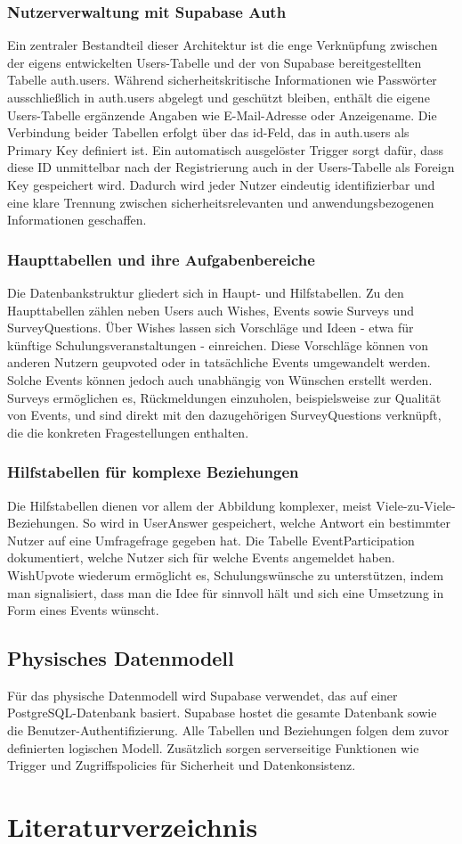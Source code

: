 \documentclass[a4paper,12pt]{article}
\begin{document}
\subsubsection{Nutzerverwaltung mit Supabase Auth}
Ein zentraler Bestandteil dieser Architektur ist die enge Verknüpfung zwischen der eigens entwickelten Users-Tabelle und der von Supabase bereitgestellten Tabelle auth.users. Während sicherheitskritische Informationen wie Passwörter ausschließlich in auth.users abgelegt und geschützt bleiben, enthält die eigene Users-Tabelle ergänzende Angaben wie E-Mail-Adresse oder Anzeigename. Die Verbindung beider Tabellen erfolgt über das id-Feld, das in auth.users als Primary Key definiert ist. Ein automatisch ausgelöster Trigger sorgt dafür, dass diese ID unmittelbar nach der Registrierung auch in der Users-Tabelle als Foreign Key gespeichert wird. Dadurch wird jeder Nutzer eindeutig identifizierbar und eine klare Trennung zwischen sicherheitsrelevanten und anwendungsbezogenen Informationen geschaffen.
\subsubsection{Haupttabellen und ihre Aufgabenbereiche}
Die Datenbankstruktur gliedert sich in Haupt- und Hilfstabellen. Zu den Haupttabellen zählen neben Users auch Wishes, Events sowie Surveys und SurveyQuestions. Über Wishes lassen sich Vorschläge und Ideen - etwa für künftige Schulungsveranstaltungen - einreichen. Diese Vorschläge können von anderen Nutzern geupvoted oder in tatsächliche Events umgewandelt werden. Solche Events können jedoch auch unabhängig von Wünschen erstellt werden. Surveys ermöglichen es, Rückmeldungen einzuholen, beispielsweise zur Qualität von Events, und sind direkt mit den dazugehörigen SurveyQuestions verknüpft, die die konkreten Fragestellungen enthalten.
\subsubsection{Hilfstabellen für komplexe Beziehungen}
Die Hilfstabellen dienen vor allem der Abbildung komplexer, meist Viele-zu-Viele-Beziehungen. So wird in UserAnswer gespeichert, welche Antwort ein bestimmter Nutzer auf eine Umfragefrage gegeben hat. Die Tabelle EventParticipation dokumentiert, welche Nutzer sich für welche Events angemeldet haben. WishUpvote wiederum ermöglicht es, Schulungswünsche zu unterstützen, indem man signalisiert, dass man die Idee für sinnvoll hält und sich eine Umsetzung in Form eines Events wünscht.
\subsection{Physisches Datenmodell}
Für das physische Datenmodell wird Supabase verwendet, das auf einer PostgreSQL-Datenbank basiert. Supabase hostet die gesamte Datenbank sowie die Benutzer-Authentifizierung. Alle Tabellen und Beziehungen folgen dem zuvor definierten logischen Modell. Zusätzlich sorgen serverseitige Funktionen wie Trigger und Zugriffspolicies für Sicherheit und Datenkonsistenz.
\newpage
\section{Literaturverzeichnis}
\end{document}
